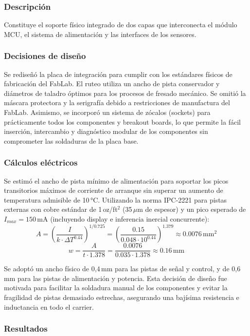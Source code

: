 \documentclass[letterpaper,11pt]{article}
\begin{document}
\subsubsection{Descripción}

Constituye el soporte físico integrado de dos capas que interconecta el módulo MCU, el sistema de alimentación y las interfaces de los sensores.

\subsubsection{Decisiones de diseño}

Se rediseñó la placa de integración para cumplir con los estándares físicos de fabricación del FabLab. El ruteo utiliza un ancho de pista conservador y diámetros de taladro óptimos para los procesos de fresado mecánico. Se omitió la máscara protectora y la serigrafía debido a restricciones de manufactura del FabLab. Asimismo, se incorporó un sistema de zócalos (sockets) para prácticamente todos los componentes y breakout boards, lo que permite la fácil inserción, intercambio y diagnóstico modular de los componentes sin comprometer las soldaduras de la placa base.

\subsubsection{Cálculos eléctricos}

Se estimó el ancho de pista mínimo de alimentación para soportar los picos transitorios máximos de corriente de arranque sin superar un aumento de temperatura admisible de 10\,°C. Utilizando la norma IPC-2221 para pistas externas con cobre estándar de 1\,oz/ft$^2$ (35\,$\mu$m de espesor) y un pico esperado de $I_{max} = 150$\,mA (incluyendo display e inferencia inercial concurrente):
$$A = \left( \frac{I}{k \cdot \Delta T^{0.44}} \right)^{1/0.725} = \left( \frac{0.15}{0.048 \cdot 10^{0.44}} \right)^{1.379} \approx 0.0076\,\text{mm}^2$$
$$w = \frac{A}{t \cdot 1.378} = \frac{0.0076}{0.035 \cdot 1.378} \approx 0.16\,\text{mm}$$

Se adoptó un ancho físico de 0,4\,mm para las pistas de señal y control, y de 0,6\,mm para las pistas de alimentación y potencia. Esta decisión de diseño fue motivada para facilitar la soldadura manual de los componentes y evitar la fragilidad de pistas demasiado estrechas, asegurando una bajísima resistencia e inductancia en todo el carrier.

\subsubsection{Resultados}
\end{document}
